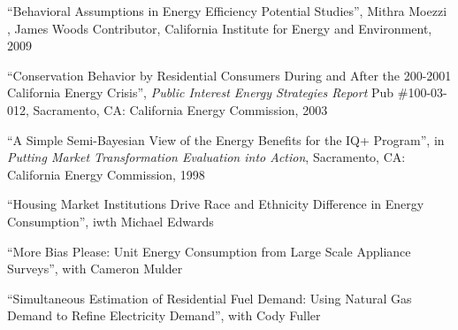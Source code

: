 \documentclass[Computer Science]{vita}
\begin{document}
\begin{vita}
\begin{Selected Publications}
\begin{Unrefereed Public Reports}
    \item ``Behavioral Assumptions in Energy Efficiency Potential
      Studies'', Mithra Moezzi , James Woods Contributor, California
      Institute for Energy and Environment, 2009

    \item ``Conservation Behavior by Residential Consumers During and
      After the 200-2001 California Energy Crisis'', \emph{Public
        Interest Energy Strategies Report} Pub \#100-03-012,
      Sacramento, CA: California Energy Commission, 2003

	
    \item ``A Simple Semi-Bayesian View of the Energy Benefits for the
      IQ+ Program'', in \emph{Putting Market Transformation Evaluation
        into Action}, Sacramento, CA: California Energy Commission,
      1998
	
    \end{Unrefereed Public Reports}

\begin{Working Papers}

    
\item ``Housing Market Institutions Drive Race and Ethnicity Difference in Energy Consumption'', iwth Michael Edwards

\item ``More Bias Please: Unit Energy Consumption from Large Scale Appliance Surveys'', with Cameron Mulder

\item ``Simultaneous Estimation of Residential Fuel Demand: Using Natural Gas Demand to Refine Electricity Demand'', with Cody Fuller


 
\end{Working Papers}

  \end{Selected Publications}


\end{vita}
\end{document}
